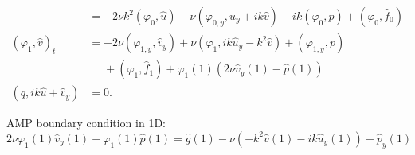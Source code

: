 \documentclass[8pt]{beamer}
\begin{document}
\begin{frame}
\begin{align}
        &=
        -2 \nu k^2 (\varphi_0, \hat{u})
        - \nu (\varphi_{0,y}, \hat{u}_y + i k \hat{v})
        - i k (\varphi_0, p)
        + (\varphi_0, \hat{f}_0)                                              \\
        (\varphi_1, \hat{v})_t
        &=
        -2 \nu (\varphi_{1,y}, \hat{v}_y)
        + \nu (\varphi_1, i k \hat{u}_y - k^2 \hat{v})
        + (\varphi_{1,y}, p)                                                  \\
        &\phantom{=} + (\varphi_1, \hat{f}_1)
        + \varphi_1(1) (2 \nu \hat{v}_y(1) - \hat{p}(1))
        \nonumber                                                             \\
        (q, i k \hat{u} + \hat{v}_y)
        &= 0.
    \end{align}

    \pause
    AMP boundary condition in 1D:
    \begin{equation}
        2 \nu \varphi_1(1) \hat{v}_y(1) - \varphi_1(1) \hat{p}(1)
        = \hat{g}(1) - \nu (-k^2 \hat{v}(1) - i k \hat{u}_y(1)) + \hat{p}_y(1)
    \end{equation}
\end{frame}
\end{document}
